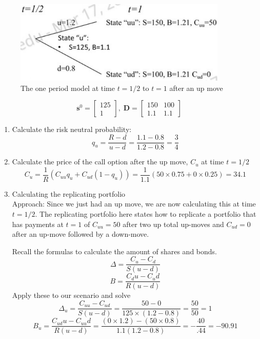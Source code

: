 \documentclass[11pt]{article}
\begin{document}
\begin{figure}[H] 
    \centering 
    \includegraphics[width=4in]{imgs/two_period_two_state_bin_tree_model_up.jpeg}
    \caption{The one period model at time $t=1/2$ to $t=1$ after an up move}
\end{figure}
\[ 
    \boldsymbol{s}^0 = 
    \begin{bmatrix}
        125 \\ 
        1     
    \end{bmatrix}, \;
    \boldsymbol{D} = 
    \begin{bmatrix}
        150 & 100 \\
        1.1 & 1.1 
    \end{bmatrix}
\]

\begin{enumerate}
    \item Calculate the risk neutral probability:
    \[
      q_u = \frac{R-d}{u-d} = \frac{1.1-0.8}{1.2-0.8} = \frac{3}{4}   
    \]
    \item Calculate the price of the call option after the up move, $C_u$ at time $t=1/2$
    \[
      C_u = \frac{1}{R}(C_{uu} q_u + C_{ud} (1-q_u))
      = \frac{1}{1.1} (50 \times 0.75 + 0 \times 0.25)  
      = 34.1
    \]
    \item Calculating the replicating portfolio \\
    Approach: Since we just had an up move, we are now calculating this at time $t=1/2$. The 
    replicating portfolio here states how to replicate a portfolio that has payments at $t=1$ of 
    $C_{uu}=50$ after two up total up-moves and $C_{ud} = 0$ after an up-move followed by a 
    down-move.
    
    Recall the formulas to calculate the amount of shares and bonds.
    \[\Delta = \frac{C_u - C_d}{S (u-d)}\]
    \[B = \frac{C_d u- C_u d}{R(u-d)}\]
    Apply these to our scenario and solve
    \[
    \Delta_u = \frac{C_{uu} - C_{ud}}{S (u-d)} 
    = \frac{50 - 0}{125 \times (1.2-0.8)}
    = \frac{50}{50}
    = 1
    \]
    \[
    B_u = \frac{C_{ud}u - C_{uu} d}{R(u-d)}
    = \frac{(0 \times 1.2) - (50 \times 0.8)}{1.1(1.2-0.8)}
    = -\frac{40}{.44}
    = -90.91
    \]
\end{enumerate}
\end{document}
